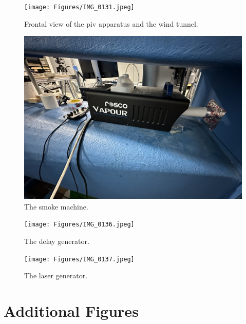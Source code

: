 \begin{figure}[htpb]
    \centering
    \texttt{[image: Figures/IMG\_0131.jpeg]}
    \caption{Frontal view of the \acrshort{piv} apparatus and the wind tunnel.}
    \label{fig:Full_Apparatus}
\end{figure}

\begin{figure}[htpb]
    \centering
    \includegraphics[width=\linewidth]{Figures/IMG_0135.jpeg}
    \caption{The smoke machine.}
    \label{fig:smoke_machine}
\end{figure}

\begin{figure}[htpb]
    \centering
    \texttt{[image: Figures/IMG\_0136.jpeg]}
    \caption{The delay generator.}
    \label{fig:delay_generator}
\end{figure}

\begin{figure}[htpb]
    \centering
    \texttt{[image: Figures/IMG\_0137.jpeg]}
    \caption{The laser generator.}
    \label{fig:laser_generator}
\end{figure}

\newpage
\section{Additional Figures} \label{sec:additional_figures}

\begin{figure}[htpb]
    \centering
    
    \caption{}
    \label{fig:}
\end{figure}

